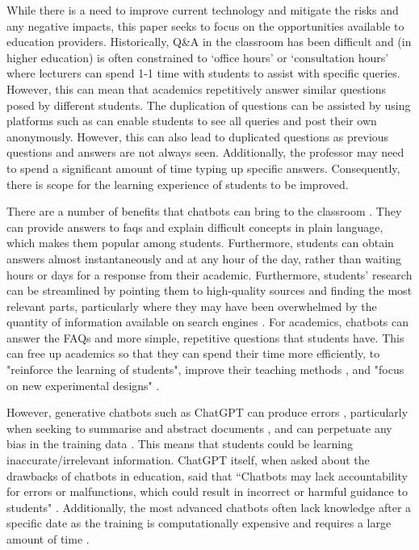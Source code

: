 While there is a need to improve current technology and mitigate the risks and any negative impacts, this paper seeks to focus on the opportunities available to education providers. Historically, Q\&A in the classroom has been difficult and (in higher education) is often constrained to `office hours' or `consultation hours' where lecturers can spend 1-1 time with students to assist with specific queries. However, this can mean that academics repetitively answer similar questions posed by different students. The duplication of questions can be assisted by using platforms such as \citet{Piazza} can enable students to see all queries and post their own anonymously. However, this can also lead to duplicated questions as previous questions and answers are not always seen. Additionally, the professor may need to spend a significant amount of time typing up specific answers. Consequently, there is scope for the learning experience of students to be improved.

There are a number of benefits that chatbots can bring to the classroom \citep{Stanislav}. They can provide answers to \acrshort{faq}s and explain difficult concepts in plain language, which makes them popular among students. Furthermore, students can obtain answers almost instantaneously and at any hour of the day, rather than waiting hours or days for a response from their academic. Furthermore, students' research can be streamlined by pointing them to high-quality sources and finding the most relevant parts, particularly where they may have been overwhelmed by the quantity of information available on search engines \citep{Chen22}. For academics, chatbots can answer the FAQs and more simple, repetitive questions that students have. This can free up academics so that they can spend their time more efficiently, to "reinforce the learning of students", improve their teaching methods \citep{Prez2020}, and "focus on new experimental designs" \citep{Eva}.

However, generative chatbots such as ChatGPT can produce errors \citep{marcus2018, Bender21, Eva}, particularly when seeking to summarise and abstract documents \citep{Durmus_2020}, and can perpetuate any bias in the training data \citep{geva2019, brown2020}. This means that students could be learning inaccurate/irrelevant information. ChatGPT itself, when asked about the drawbacks of chatbots in education, said that ``Chatbots may lack accountability for errors or malfunctions, which could result in incorrect or harmful guidance to students" \citep{chatgpt23}. Additionally, the most advanced chatbots often lack knowledge after a specific date as the training is computationally expensive and requires a large amount of time \citep{Jungherr}.

